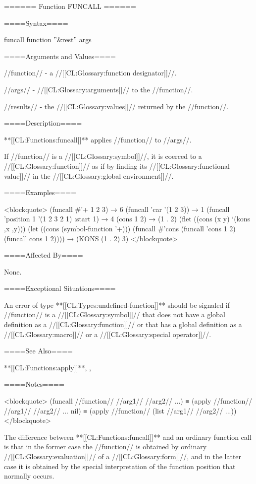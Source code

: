 ====== Function FUNCALL ======

====Syntax====

\DefunWithValues funcall {function ''&rest'' args} {}

====Arguments and Values====

//function// - a //[[CL:Glossary:function designator]]//.

//args// - //[[CL:Glossary:arguments]]// to the //function//.

//results// - the //[[CL:Glossary:values]]// returned by the //function//.

====Description====

**[[CL:Functions:funcall]]** applies //function// to //args//.

If //function// is a //[[CL:Glossary:symbol]]//, it is coerced to a //[[CL:Glossary:function]]// as if by finding its //[[CL:Glossary:functional value]]// in the //[[CL:Glossary:global environment]]//.

====Examples====

<blockquote> (funcall #'+ 1 2 3) → 6 (funcall 'car '(1 2 3)) → 1 (funcall 'position 1 '(1 2 3 2 1) :start 1) → 4 (cons 1 2) → (1 . 2) (flet ((cons (x y) `(kons ,x ,y))) (let ((cons (symbol-function '+))) (funcall #'cons (funcall 'cons 1 2) (funcall cons 1 2)))) → (KONS (1 . 2) 3) </blockquote>

====Affected By====

None.

====Exceptional Situations====

An error of type **[[CL:Types:undefined-function]]** should be signaled if //function// is a //[[CL:Glossary:symbol]]// that does not have a global definition as a //[[CL:Glossary:function]]// or that has a global definition as a //[[CL:Glossary:macro]]// or a //[[CL:Glossary:special operator]]//.

====See Also====

**[[CL:Functions:apply]]**, , {\secref\Evaluation}

====Notes====

<blockquote> (funcall //function// //arg1// //arg2// ...) ≡ (apply //function// //arg1// //arg2// ... nil) ≡ (apply //function// (list //arg1// //arg2// ...)) </blockquote>

The difference between **[[CL:Functions:funcall]]** and an ordinary function call is that in the former case the //function// is obtained by ordinary //[[CL:Glossary:evaluation]]// of a //[[CL:Glossary:form]]//, and in the latter case it is obtained by the special interpretation of the function position that normally occurs.

